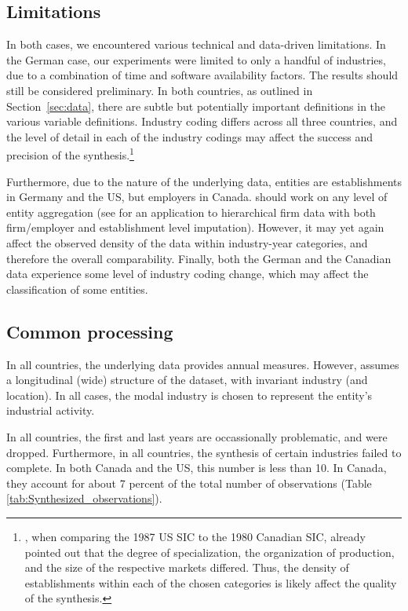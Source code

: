 \subsection{Limitations}

In both cases, we encountered various technical and data-driven limitations. In the German case, our experiments were limited to only a handful of industries, due to a combination of time and software availability factors. The results should still be considered preliminary. In both countries, as outlined in Section~\ref{sec:data}, there are subtle but potentially important definitions in the various variable definitions. Industry coding differs across all three countries, and the level of detail in each of the industry codings may affect the success and precision of the synthesis.\footnote{\textcite{StatisticsCanada1991}, when comparing the 1987 US \ac{SIC} to the 1980 Canadian \ac{SIC},  already pointed out that the degree of specialization, the organization of production, and the size of the respective markets differed. Thus, the density of establishments within each of the chosen categories is likely affect the quality of the synthesis.} 

Furthermore, due to the nature of the underlying data, entities are establishments in Germany and the US, but employers in Canada. \SynLBD{} should work on any level of entity aggregation (see \citet{RePEc:cen:wpaper:14-12} for an application to hierarchical firm data with both firm/employer and establishment level imputation). However, it may yet again affect the observed density of the data within industry-year categories, and therefore the overall comparability. Finally, both the German and the Canadian data experience some level of industry coding change, which may affect the classification of some entities.

\subsection{Common processing}

In all countries, the underlying data provides annual measures. However, \SynLBD{} assumes a longitudinal (wide) structure of the dataset, with invariant industry (and location). In all cases, the modal industry is chosen to represent the entity's industrial activity. 

In all countries, the first and last years are occassionally problematic, and were dropped. Furthermore, in all countries, the synthesis of certain industries failed to complete. In both Canada and the US, this number is less than 10. In Canada, they account for about 7 percent of the total number of observations (Table \ref{tab:Synthesized_observations}).



